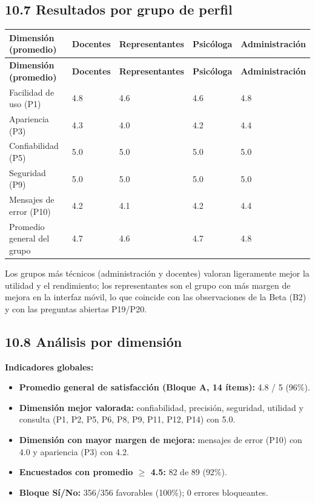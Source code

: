 \documentclass[11pt,a4paper]{article}
\begin{document}
\subsection*{10.7 Resultados por grupo de perfil}


{\small
\begin{longtable}{|p{}|p{}|p{}|p{}|p{}|}
\rowcolor{UTECblue}\color{white}\bfseries Dimensión (promedio) & \color{white}\bfseries Docentes & \color{white}\bfseries Representantes & \color{white}\bfseries Psicóloga & \color{white}\bfseries Administración \\ \hline
\endfirsthead
\rowcolor{UTECblue}\color{white}\bfseries Dimensión (promedio) & \color{white}\bfseries Docentes & \color{white}\bfseries Representantes & \color{white}\bfseries Psicóloga & \color{white}\bfseries Administración \\ \hline
\endhead
Facilidad de uso (P1) & 4.8 & 4.6 & 4.6 & 4.8 \\ \hline
Apariencia (P3) & 4.3 & 4.0 & 4.2 & 4.4 \\ \hline
Confiabilidad (P5) & 5.0 & 5.0 & 5.0 & 5.0 \\ \hline
Seguridad (P9) & 5.0 & 5.0 & 5.0 & 5.0 \\ \hline
Mensajes de error (P10) & 4.2 & 4.1 & 4.2 & 4.4 \\ \hline
Promedio general del grupo & 4.7 & 4.6 & 4.7 & 4.8 \\ \hline
\end{longtable}}


Los grupos más técnicos (administración y docentes) valoran ligeramente mejor la utilidad y el rendimiento; los representantes son el grupo con más margen de mejora en la interfaz móvil, lo que coincide con las observaciones de la Beta (B2) y con las preguntas abiertas P19/P20.


\subsection*{10.8 Análisis por dimensión}


\textbf{Indicadores globales:}


\begin{itemize}[leftmargin=*]
\item \textbf{Promedio general de satisfacción (Bloque A, 14 ítems):} 4.8 / 5 (96\%).
\item \textbf{Dimensión mejor valorada:} confiabilidad, precisión, seguridad, utilidad y consulta (P1, P2, P5, P6, P8, P9, P11, P12, P14) con 5.0.
\item \textbf{Dimensión con mayor margen de mejora:} mensajes de error (P10) con 4.0 y apariencia (P3) con 4.2.
\item \textbf{Encuestados con promedio {$\geq$} 4.5:} 82 de 89 (92\%).
\item \textbf{Bloque Sí/No:} 356/356 favorables (100\%); 0 errores bloqueantes.
\end{itemize}
\end{document}
